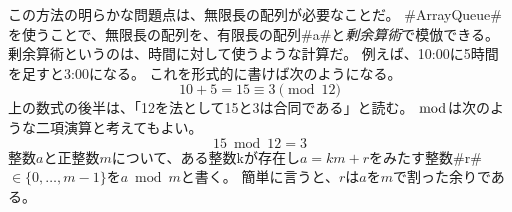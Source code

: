 この方法の明らかな問題点は、無限長の配列が必要なことだ。
#ArrayQueue#を使うことで、無限長の配列を、有限長の配列#a#と\emph{剰余算術}で模倣できる。
%
剰余算術というのは、時間に対して使うような計算だ。
例えば、10:00に5時間を足すと3:00になる。
これを形式的に書けば次のようになる。
\[
    10 + 5 = 15 \equiv 3 \pmod{12}
\]
上の数式の後半は、「12を法として15と3は合同である」と読む。
$\bmod$は次のような二項演算と考えてもよい。
\[
   15 \bmod 12 = 3
\]
整数$a$と正整数$m$について、ある整数kが存在し$a = km + r$をみたす整数#r# $\in \{0, \ldots, m-1 \}$を$a \bmod m $と書く。
簡単に言うと、$r$は$a$を$m$で割った余りである。
